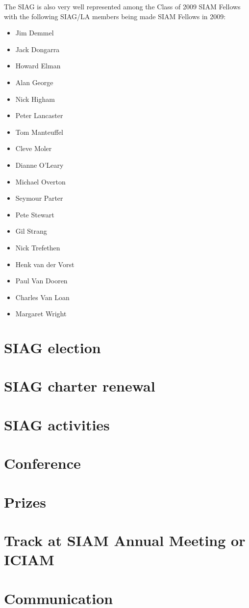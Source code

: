 \documentclass[]{article}
\begin{document}
The SIAG is also very well represented among the Class of 2009 SIAM Fellows
with the following SIAG/LA members being made SIAM Fellows in 2009:
\begin{itemize}
\item Jim Demmel 
\item Jack Dongarra 
\item Howard Elman 
\item Alan George 
\item Nick Higham 
\item Peter Lancaster 
\item Tom Manteuffel 
\item Cleve Moler 
\item Dianne O'Leary 
\item Michael Overton
\item Seymour Parter
\item Pete Stewart 
\item Gil Strang 
\item Nick Trefethen 
\item Henk van der Vorst
\item Paul Van Dooren 
\item Charles Van Loan
\item Margaret Wright
\end{itemize} 


\section{SIAG election}
\section{SIAG charter renewal}
\section{SIAG activities}
\section{Conference}
\section{Prizes}
\section{Track at SIAM Annual Meeting or ICIAM}
\section{Communication}
\end{document}
